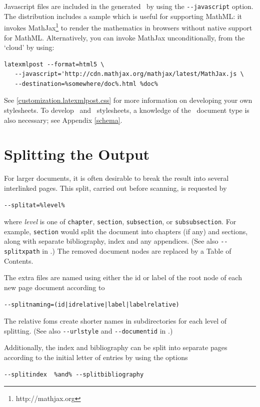 \documentclass{book}
\newcommand{\shellcode}{\lstinline[style=shell]}
\begin{document}
Javascript files are included in the generated \HTML\ by using the \shellcode{--javascript} option.
The distribution includes a sample  which is useful
for supporting MathML: it invokes MathJax\footnote{http://mathjax.org}
to render the mathematics in browsers without native support for MathML.
Alternatively, you can invoke MathJax unconditionally, from the `cloud' by using:
\begin{lstlisting}[style=shell]
latexmlpost --format=html5 \
   --javascript='http://cdn.mathjax.org/mathjax/latest/MathJax.js \
   --destination=%somewhere/doc%.html %doc%
\end{lstlisting}

See \ref{customization.latexmlpost.css} for more information on developing your own stylesheets.
To develop \CSS\ and \XSLT\ stylesheets, 
a knowledge of the \LaTeXML\ document type is also necessary; see  Appendix \ref{schema}.

\section[Splitting]{Splitting the Output}\label{usage.multiple}
For larger documents, it is often desirable to break the 
result into several interlinked pages. This split,
carried out before scanning, is requested by 
\begin{lstlisting}[style=shell]
--splitat=%level%
\end{lstlisting}
where \textit{level} is one of \texttt{chapter},
\texttt{section}, \texttt{subsection}, or \texttt{subsubsection}.
For example, \texttt{section} would split the document into
chapters (if any) and sections, along with separate
bibliography, index and any appendices.
(See also \shellcode{--splitxpath} in .)
The removed document nodes are replaced by a Table of Contents.

The extra files are named using either the id or label
of the root node of each new page document according to
\begin{lstlisting}[style=shell]
--splitnaming=(id|idrelative|label|labelrelative)
\end{lstlisting}
The relative foms create shorter names in subdirectories for each
level of splitting.
(See also \shellcode{--urlstyle} and  \shellcode{--documentid} in .)

Additionally, the index and bibliography can be split
into separate pages according to the initial letter of entries by using the options
\begin{lstlisting}[style=shell]
--splitindex  %and% --splitbibliography
\end{lstlisting}
\end{document}
